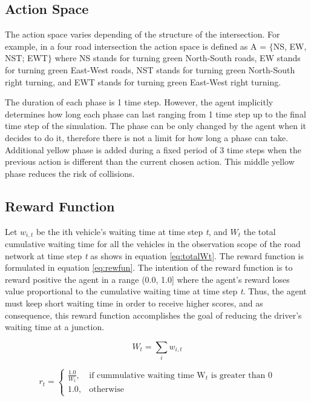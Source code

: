 \documentclass{llncs}
\begin{document}
\subsection{Action Space}

The action space varies depending of the structure of the intersection. For example, in a four road intersection the action space is defined as A = $\{$NS, EW, NST; EWT$\}$ where NS stands for turning green North-South roads, EW stands for turning green East-West roads, NST stands for turning green North-South right turning, and EWT stands for turning green East-West right turning.

The duration of each phase is 1 time step. However, the agent implicitly determines how long each phase can last ranging from 1 time step up to the final time step of the simulation. The phase can be only changed by the agent when it decides to do it, therefore there is not a limit for how long a phase can take. Additional yellow phase is added during a fixed period of 3 time steps when the previous action is different than the current chosen action. This middle yellow phase reduces the risk of collisions.

\subsection{Reward Function}

Let $w_{i,t}$ be the ith vehicle's waiting time at time step \textit{t}, and $W_{t}$ the total cumulative waiting time for all the vehicles in the observation scope of the road network at time step \textit{t} as shows in equation \ref{eq:totalWt}. The reward function is formulated in equation \ref{eq:rewfun}. The intention of the reward function is to reward positive the agent in a range (0.0, 1.0] where the agent's reward loses value proportional to the cumulative waiting time at time step \textit{t}. Thus, the agent must keep short waiting time in order to receive higher scores, and as consequence, this reward function accomplishes the goal of reducing the driver's waiting time at a junction.

\begin{equation} \label{eq:totalWt}
W_{t} = \sum_{i}w_{i,t}
\end{equation}

\begin{equation} \label{eq:rewfun}
r_{t} = \begin{cases}
    \frac{1.0}{W_{t}}, & \text{if cummulative waiting time W$_{t}$ is greater than 0}\\
    1.0, & \text{otherwise}
\end{cases}
\end{equation}
\end{document}
